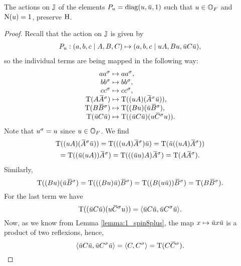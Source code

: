 \begin{lemma}
	\label{lemma:3_pu_hermitean}
	The actions on $\mathbb{J}$ of the elements $P_u = \mathrm{diag}(u,\mathord{\mbox{\hspace*{0pt}}\,\overline{\!u\!\!\;}\!\:}\mbox{\hspace*{0pt}},1)$ such that $u \in \mathbb{O}_F$ and $\mathord{\mathrm{N}}(u) = 1$,
	preserve $\mathrm{H}$.
\end{lemma}

\begin{proof}
	Recall that the action on $\mathbb{J}$ is given by
	\begin{equation*}
		\begin{array}{r@{\;}c@{\;}l}
			P_u : (a, b, c \mid A, B, C) & \mapsto & (a, b, c \mid u A, B u, \ovu C \ovu),
		\end{array}
	\end{equation*}
	so the individual terms are being mapped in the following way:
	\begin{equation*}
		\begin{array}{r@{\;}c@{\;}l}
			a a^{\s} & \mapsto & a a^{\s}, \\
			b b^{\s} & \mapsto & b b^{\s}, \\
			c c^{\s} & \mapsto & c c^{\s}, \\
			\Tr( A \ovA^{\s} ) & \mapsto & \Tr( (u A) (\ovA^{\s} \ovu) ), \\
			\Tr( B \ovB^{\s} ) & \mapsto & \Tr( (B u) (\ovu \ovB^{\s} ), \\
			\Tr( \ovu C \ovu ) & \mapsto & \Tr( (\ovu C \ovu) (u \ovC^{\s} u) ).
		\end{array}
	\end{equation*}
	Note that $u^{\sigma} = u$ since $u \in \mathbb{O}_F$. We find
	\begin{multline*}
		\Tr( (u A) (\ovA^{\s} \ovu) ) = \Tr( ((u A) \ovA^{\s}) \ovu ) = 
		\Tr( \ovu ((u A) \ovA^{\s}) ) \\
		= \Tr( ( \ovu (u A) ) \ovA^{\s} ) = 
		\Tr( ( (\ovu u) A ) \ovA^{\s} ) = \Tr(A \ovA^{\s}).
	\end{multline*}
	Similarly,
	\begin{equation*}
		 \Tr( (B u) (\ovu \ovB^{\s} ) = \Tr( ((B u) \ovu ) \ovB^{\s} ) = 
		 \Tr( (B (u \ovu) ) \ovB^{\s} ) = \Tr(B \ovB^{\s}).
	\end{equation*}
	For the last term we have
	\begin{equation*}
		\Tr( (\ovu C \ovu) (u \ovC^{\s} u) ) = \inner{\ovu C \ovu}{\ovu C^{\s} \ovu}.
	\end{equation*}
	Now, as we know from Lemma \ref{lemma:1_spin8plus}, the map $x \mapsto \ovu x \ovu$ is
	a product of two reflexions, hence,  
	\begin{equation*}
		\inner{\ovu C \ovu}{\ovu C^{\s} \ovu} = \inner{C}{C^{\s}} = \Tr(C\ovC^{\s}).
	\end{equation*}
\end{proof}

